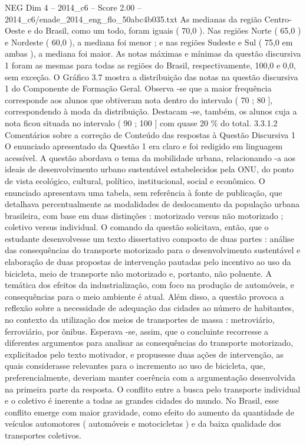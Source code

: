 \begin{textsample}{NEG Dim 4 – 2014\_c6 – Score 2.00 – 2014\_c6/enade\_2014\_eng\_flo\_50abc4b035.txt}
As medianas da região Centro-Oeste e do Brasil, como um todo, foram iguais ( 70,0 ).
Nas regiões Norte ( 65,0 ) e Nordeste ( 60,0 ), a mediana foi menor ; e nas regiões Sudeste e Sul ( 75,0 em ambas ), a mediana foi maior.
As notas máximas e mínimas da questão discursiva 1 foram as mesmas para todas as regiões do Brasil, respectivamente, 100,0 e 0,0, sem exceção.
O Gráfico 3.7 mostra a distribuição das notas na questão discursiva 1 do Componente de Formação Geral.
Observa -se que a maior frequência corresponde aos alunos que obtiveram nota dentro do intervalo ( 70 ; 80 ], correspondendo à moda da distribuição.
Destacam -se, também, os alunos cuja a nota ficou situada no intervalo ( 90 ; 100 ] com quase 20 \% do total. 3.3.1.2 Comentários sobre a correção de Conteúdo das respostas à Questão Discursiva 1 O enunciado apresentado da Questão 1 era claro e foi redigido em linguagem acessível.
A questão abordava o tema da mobilidade urbana, relacionando -a aos ideais de desenvolvimento urbano sustentável estabelecidos pela ONU, do ponto de vista ecológico, cultural, político, institucional, social e econômico.
O enunciado apresentava uma tabela, sem referência à fonte de publicação, que detalhava percentualmente as modalidades de deslocamento da população urbana brasileira, com base em duas distinções : motorizado versus não motorizado ; coletivo versus individual.
O comando da questão solicitava, então, que o estudante desenvolvesse um texto dissertativo composto de duas partes : análise das consequências do transporte motorizado para o desenvolvimento sustentável e elaboração de duas propostas de intervenção pautadas pelo incentivo ao uso da bicicleta, meio de transporte não motorizado e, portanto, não poluente.
A temática dos efeitos da industrialização, com foco na produção de automóveis, e consequências para o meio ambiente é atual.
Além disso, a questão provoca a reflexão sobre a necessidade de adequação das cidades ao número de habitantes, no contexto da utilização dos meios de transportes de massa : metroviário, ferroviário, por ônibus.
Esperava -se, assim, que o concluinte recorresse a diferentes argumentos para analisar as consequências do transporte motorizado, explicitados pelo texto motivador, e propusesse duas ações de intervenção, as quais considerasse relevantes para o incremento ao uso de bicicleta, que, preferencialmente, deveriam manter coerência com a argumentação desenvolvida na primeira parte da resposta.
O conflito entre a busca pelo transporte individual e o coletivo é inerente a todas as grandes cidades do mundo.
No Brasil, esse conflito emerge com maior gravidade, como efeito do aumento da quantidade de veículos automotores ( automóveis e motocicletas ) e da baixa qualidade dos transportes coletivos.

\end{textsample}
